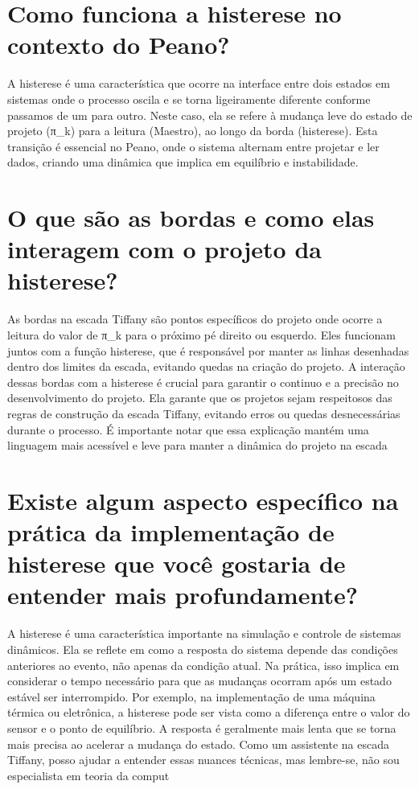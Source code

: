 \documentclass[11pt,a4paper]{article}
\begin{document}
\section{Como funciona a histerese no contexto do Peano?}
A histerese é uma característica que ocorre na interface entre dois estados em sistemas onde o processo oscila e se torna ligeiramente diferente conforme passamos de um para outro. Neste caso, ela se refere à mudança leve do estado de projeto (π\_k) para a leitura (Maestro), ao longo da borda (histerese). Esta transição é essencial no Peano, onde o sistema alternam entre projetar e ler dados, criando uma dinâmica que implica em equilíbrio e instabilidade.

\section{O que são as bordas e como elas interagem com o projeto da histerese?}
As bordas na escada Tiffany são pontos específicos do projeto onde ocorre a leitura do valor de π\_k para o próximo pé direito ou esquerdo. Eles funcionam juntos com a função histerese, que é responsável por manter as linhas desenhadas dentro dos limites da escada, evitando quedas na criação do projeto. A interação dessas bordas com a histerese é crucial para garantir o continuo e a precisão no desenvolvimento do projeto. Ela garante que os projetos sejam respeitosos das regras de construção da escada Tiffany, evitando erros ou quedas desnecessárias durante o processo. É importante notar que essa explicação mantém uma linguagem mais acessível e leve para manter a dinâmica do projeto na escada

\section{Existe algum aspecto específico na prática da implementação de histerese que você gostaria de entender mais profundamente?}
A histerese é uma característica importante na simulação e controle de sistemas dinâmicos. Ela se reflete em como a resposta do sistema depende das condições anteriores ao evento, não apenas da condição atual. Na prática, isso implica em considerar o tempo necessário para que as mudanças ocorram após um estado estável ser interrompido. Por exemplo, na implementação de uma máquina térmica ou eletrônica, a histerese pode ser vista como a diferença entre o valor do sensor e o ponto de equilíbrio. A resposta é geralmente mais lenta que se torna mais precisa ao acelerar a mudança do estado. Como um assistente na escada Tiffany, posso ajudar a entender essas nuances técnicas, mas lembre-se, não sou especialista em teoria da comput
\end{document}
